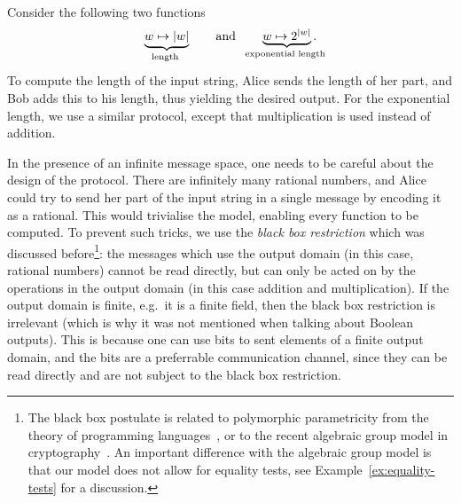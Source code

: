 \begin{myexample}\label{ex:length}
    Consider the following two functions
\begin{align*}
\myunderbrace{w \mapsto |w|}{length} \qquad \text{and} \qquad \myunderbrace{w \mapsto 2^{|w|}}{exponential length}.
\end{align*}
To compute the length of the input string, Alice  sends the length of her part, and Bob adds this to his length, thus yielding the desired output. For the exponential length, we use a similar protocol, except that multiplication is used instead of addition. 
\end{myexample}


In the presence of an infinite message space, one needs to be careful about the design of the protocol. There are infinitely many rational numbers, and Alice could try to send her part of the input string in a single message by encoding it as a rational. This would trivialise the model, enabling every function to be computed. To prevent such tricks, we use the \emph{black box restriction} which was discussed before\footnote{The black box postulate is related to  polymorphic parametricity from the theory of programming languages~\cite[Section 7]{reynolds1983types}, or to the recent algebraic group model in cryptography~\cite[Section 1.2]{fuchsbauer2018algebraic}. An important difference with the algebraic group model is that our model does not allow for equality tests, see Example~\ref{ex:equality-tests} for a discussion.}: the messages which use the output domain (in this case, rational numbers) cannot be read directly, but can only be acted on by the operations in the output domain (in this case addition and multiplication).
 If the output domain is finite, e.g.~it is a finite field, then the black box restriction is irrelevant (which is why it was not mentioned when talking about Boolean outputs). This is because one can use bits to sent elements of a finite output domain, and the bits are a preferrable communication channel, since they can be read directly and are not subject to the black box restriction. 

